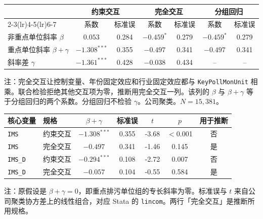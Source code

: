 \begin{center}
\begin{threeparttable}
\caption{当期重点排污单位：\texttt{IMS} 的组斜率}
\label{tab:keypoll-slopes-advisor}
\begin{tabular}{lcccccc}
\toprule
 & \multicolumn{2}{c}{约束交互} & \multicolumn{2}{c}{完全交互} & \multicolumn{2}{c}{分组回归} \\
\cmidrule(lr){2-3}\cmidrule(lr){4-5}\cmidrule(lr){6-7}
 & 系数 & 标准误 & 系数 & 标准误 & 系数 & 标准误 \\
\midrule
非重点单位斜率 \(\beta\) & $0.053$ & 0.284 & $-0.459^{*}$ & 0.279 & $-0.459^{*}$ & 0.279 \\
重点单位斜率 \(\beta+\gamma\) & $-1.308^{***}$ & 0.355 & $-0.497$ & 0.341 & $-0.497$ & 0.341 \\
斜率差 \(\gamma\) & $-1.361^{***}$ & 0.428 & $-0.038$ & 0.434 & -- & -- \\
\bottomrule
\end{tabular}
\begin{tablenotes}\footnotesize
\item 注：完全交互让控制变量、年份固定效应和行业固定效应都与 \texttt{KeyPollMonUnit} 相乘。联合检验拒绝其他交互项为零，推断用完全交互一列。该列的 \(\beta\) 与 \(\beta+\gamma\) 等于分组回归的两个系数。分组回归不检验 \(\gamma\)。公司聚类。$N=15{,}381$。
\end{tablenotes}
\end{threeparttable}
\end{center}

\begin{center}
\begin{threeparttable}
\caption{重点单位专长斜率的线性组合检验}
\label{tab:keypoll-lincom}
\begin{tabular}{llccccc}
\toprule
核心变量 & 规格 & \(\beta+\gamma\) & 标准误 & \(t\) & \(p\) & 用于推断 \\
\midrule
\texttt{IMS} & 约束交互 & $-1.308^{***}$ & 0.355 & -3.68 & $<$0.001 & 否 \\
\texttt{IMS} & 完全交互 & $-0.497$ & 0.341 & -1.46 & 0.145 & 是 \\
\texttt{IMS\_D} & 约束交互 & $-0.294^{***}$ & 0.108 & -2.72 & 0.007 & 否 \\
\texttt{IMS\_D} & 完全交互 & $-0.057$ & 0.104 & -0.55 & 0.584 & 是 \\
\bottomrule
\end{tabular}
\begin{tablenotes}\footnotesize
\item 注：原假设是 \(\beta+\gamma=0\)，即重点排污单位组的专长斜率为零。标准误与 \(t\) 来自公司聚类协方差上的线性组合，对应 Stata 的 \texttt{lincom}。两行「完全交互」是推断所用规格。
\end{tablenotes}
\end{threeparttable}
\end{center}

